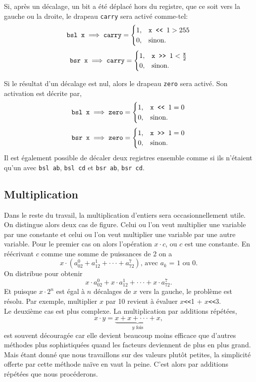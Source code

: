 \documentclass{article}
\begin{document}
Si, après un décalage, un bit a été déplacé hors du registre, que ce soit vers la gauche ou la droite, le drapeau \texttt{carry} sera activé comme-tel:
$$\texttt{bsl x} \implies \texttt{carry} = \begin{cases}
1, & \texttt{x}\verb| << | 1 > 255\\
0, & \text{sinon.}
\end{cases}$$
$$\texttt{bsr x} \implies \texttt{carry} = \begin{cases}
1, & \texttt{x}\verb| >> | 1 < \frac{\texttt{x}}{2}\\
0, & \text{sinon.}
\end{cases}$$

Si le résultat d'un décalage est nul, alors le drapeau \texttt{zero} sera activé. Son activation est décrite par,
$$\texttt{bsl x} \implies \texttt{zero} = \begin{cases}
1, & \texttt{x}\verb| << | 1 = 0\\
0, & \text{sinon.}
\end{cases}$$
$$\texttt{bsr x} \implies \texttt{zero} = \begin{cases}
1, & \texttt{x}\verb| >> | 1 = 0\\
0, & \text{sinon.}
\end{cases}$$
Il est également possible de décaler deux registres ensemble comme si ils n'étaient qu'un avec \texttt{bsl ab}, \texttt{bsl cd} et \texttt{bsr ab}, \texttt{bsr cd}.
\subsection{Multiplication}
Dans le reste du travail, la multiplication d'entiers sera occasionnellement utile. On distingue alors deux cas de figure.
Celui ou l'on veut multiplier une variable par une constante et celui ou l'on veut multiplier une variable par une autre variable.
Pour le premier cas on alors l'opération $x\cdot c$, ou $c$ est une constante. En réécrivant $c$ comme une somme de puissances de 2 on a
$$
x\cdot(a_02^0+a_12^1+\cdot\cdot\cdot+a_72^7) \text{, avec $a_k$ = 1 ou 0.}
$$
On distribue pour obtenir
$$x\cdot a_02^0+x\cdot a_12^1+\cdot\cdot\cdot+x\cdot a_72^7.$$
Et puisque $x\cdot2^n$ est égal à $n$ décalages de $x$ vers la gauche, 
le problème est résolu. Par exemple, multiplier $x$ par 10 revient à évaluer $x$\verb|<<|1 + $x$\verb|<<|3.\\
Le deuxième cas est plus complexe. La multiplication par additions répétées,
$$
x\cdot y = \underbrace{x+x+\cdot\cdot\cdot+x}_{y\text{ fois}},
$$
est souvent découragée car elle devient beaucoup moins efficace que d'autres méthodes plus sophistiquées quand les facteurs deviennent de plus en plus grand. Mais étant donné que nous travaillons sur des valeurs plutôt petites, la simplicité offerte par cette méthode naïve en vaut la peine. C'est alors par additions répétées que nous procéderons.
\end{document}
